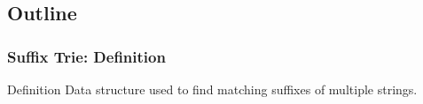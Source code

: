 \subsection{Outline}
\begin{frame}
  \frametitle{Suffix Trie: Definition}

  {\smaller
    \begin{block}{Definition}
      Data structure used to find matching suffixes of multiple strings.
    \end{block}

    \vfill

    \begin{center}
    \end{center}

    \vfill

}
\end{frame}
